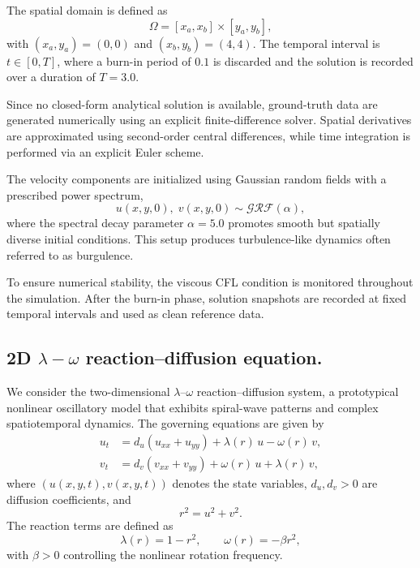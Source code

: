 \documentclass{article}
\theoremstyle{plain}
\theoremstyle{definition}
\theoremstyle{remark}
\begin{document}
The spatial domain is defined as
\begin{equation}
\Omega = [x_a, x_b] \times [y_a, y_b],
\end{equation}
with $(x_a, y_a) = (0, 0)$ and $(x_b, y_b) = (4, 4)$.
The temporal interval is $t \in [0, T]$, where a burn-in period of $0.1$ is discarded and the solution is recorded over a duration of $T = 3.0$.

Since no closed-form analytical solution is available, ground-truth data are generated numerically using an explicit finite-difference solver. Spatial derivatives are approximated using second-order central differences, while time integration is performed via an explicit Euler scheme.

The velocity components are initialized using Gaussian random fields with a prescribed power spectrum,
\begin{equation}
    u(x,y,0),\; v(x,y,0) \sim \mathcal{GRF}(\alpha),
\end{equation}
where the spectral decay parameter $\alpha = 5.0$ promotes smooth but spatially diverse initial conditions. This setup produces turbulence-like dynamics often referred to as burgulence.

To ensure numerical stability, the viscous CFL condition is monitored throughout the simulation. After the burn-in phase, solution snapshots are recorded at fixed temporal intervals and used as clean reference data.

\subsection{2D $\lambda-\omega$ reaction--diffusion equation.}

We consider the two-dimensional $\lambda$--$\omega$ reaction--diffusion system, a prototypical nonlinear oscillatory model that exhibits spiral-wave patterns and complex spatiotemporal dynamics. The governing equations are given by
\begin{align}
u_t &= d_u (u_{xx} + u_{yy}) + \lambda(r)\,u - \omega(r)\,v, \\
v_t &= d_v (v_{xx} + v_{yy}) + \omega(r)\,u + \lambda(r)\,v,
\end{align}
where $(u(x,y,t), v(x,y,t))$ denotes the state variables, $d_u, d_v > 0$ are diffusion coefficients, and
\begin{equation}
r^2 = u^2 + v^2.
\end{equation}
The reaction terms are defined as
\begin{equation}
\lambda(r) = 1 - r^2, 
\qquad 
\omega(r) = -\beta r^2,
\end{equation}
with $\beta > 0$ controlling the nonlinear rotation frequency.
\end{document}
